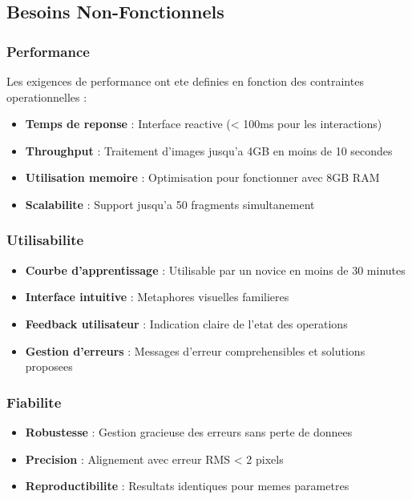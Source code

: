 \documentclass[12pt,a4paper]{article}
\begin{document}
\subsection{Besoins Non-Fonctionnels}

\subsubsection{Performance}

Les exigences de performance ont ete definies en fonction des contraintes operationnelles :

\begin{itemize}
\item \textbf{Temps de reponse} : Interface reactive (< 100ms pour les interactions)
\item \textbf{Throughput} : Traitement d'images jusqu'a 4GB en moins de 10 secondes
\item \textbf{Utilisation memoire} : Optimisation pour fonctionner avec 8GB RAM
\item \textbf{Scalabilite} : Support jusqu'a 50 fragments simultanement
\end{itemize}

\subsubsection{Utilisabilite}

\begin{itemize}
\item \textbf{Courbe d'apprentissage} : Utilisable par un novice en moins de 30 minutes
\item \textbf{Interface intuitive} : Metaphores visuelles familieres
\item \textbf{Feedback utilisateur} : Indication claire de l'etat des operations
\item \textbf{Gestion d'erreurs} : Messages d'erreur comprehensibles et solutions proposees
\end{itemize}

\subsubsection{Fiabilite}

\begin{itemize}
\item \textbf{Robustesse} : Gestion gracieuse des erreurs sans perte de donnees
\item \textbf{Precision} : Alignement avec erreur RMS < 2 pixels
\item \textbf{Reproductibilite} : Resultats identiques pour memes parametres
\end{itemize}
\end{document}
